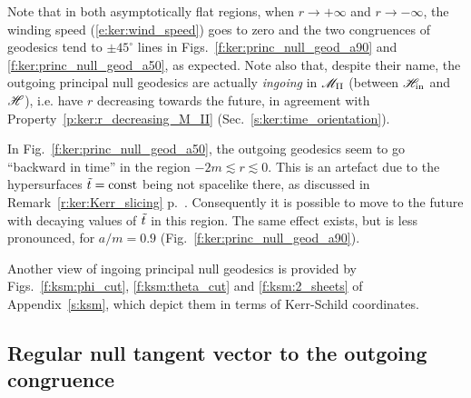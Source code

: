 Note that in both asymptotically flat regions, when $r\rightarrow +\infty$ and
$r\rightarrow -\infty$, the winding speed (\ref{e:ker:wind_speed}) goes to zero
and the two congruences of geodesics tend to $\pm 45^\circ$ lines
in Figs.~\ref{f:ker:princ_null_geod_a90} and
\ref{f:ker:princ_null_geod_a50}, as expected.
Note also that, despite their name, the outgoing principal null geodesics are actually
\emph{ingoing} in $\mathscr{M}_{\rm II}$ (between $\mathscr{H}_{\rm in}$ and $\mathscr{H}$), i.e. have $r$ decreasing
towards the future, in agreement with Property~\ref{p:ker:r_decreasing_M_II}
(Sec.~\ref{s:ker:time_orientation}).

\begin{remark}
In Fig.~\ref{f:ker:princ_null_geod_a50},
the outgoing geodesics seem to go ``backward in time'' in the region $-2m \lesssim r \lesssim 0$. This
is an artefact due to the hypersurfaces ${\tilde t} = \mathrm{const}$ being not spacelike
there, as discussed in Remark~\ref{r:ker:Kerr_slicing}
p.~\pageref{r:ker:Kerr_slicing}.
Consequently it is possible to move to the future with decaying values
of ${\tilde t}$ in this region.
The same effect exists, but is less pronounced, for $a/m=0.9$ (Fig.~\ref{f:ker:princ_null_geod_a90}).
\end{remark}

Another view of ingoing principal null geodesics is provided by Figs.~\ref{f:ksm:phi_cut},
\ref{f:ksm:theta_cut} and \ref{f:ksm:2_sheets} of Appendix~\ref{s:ksm}, which
depict them in terms of Kerr-Schild coordinates.

\subsection{Regular null tangent vector to the outgoing congruence}

